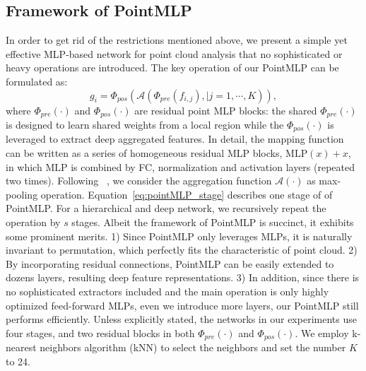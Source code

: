 \subsection{Framework of PointMLP}
In order to get rid of the restrictions mentioned above, we present a simple yet effective MLP-based network for point cloud analysis that no sophisticated or heavy operations are introduced. The key operation of our PointMLP can be formulated as:
\begin{equation}
    g_i = \Phi_{pos}\left(\mathcal{A}\left(\Phi_{pre}\left(f_{i,j}\right),|  j=1,\cdots, K\right)\right),
    \label{eq:pointMLP_stage}
\end{equation}
where $\Phi_{pre}\left(\cdot\right)$ and $\Phi_{pos}\left(\cdot\right)$ are residual point MLP blocks: the shared $\Phi_{pre}\left(\cdot\right)$ is designed to learn shared weights from a local region while the $\Phi_{pos}\left(\cdot\right)$ is leveraged to extract deep aggregated features. In detail, the mapping function can be written as a series of homogeneous residual MLP blocks, $ \mathrm{MLP}\left(x\right)+x$, in which $\mathrm{MLP}$ is combined by FC, normalization and activation layers (repeated two times). Following ~\citet{qi2017pointnet}, we consider the aggregation function $\mathcal{A}\left(\cdot\right)$ as max-pooling operation.  Equation~\ref{eq:pointMLP_stage} describes one stage of of PointMLP. For a hierarchical and deep network, we recursively repeat the operation by $s$ stages. Albeit the framework of PointMLP is succinct, it exhibits some prominent merits. 1) Since PointMLP only leverages MLPs, it is naturally invariant to permutation, which perfectly fits the characteristic of point cloud. 2) By incorporating residual connections, PointMLP can be easily extended to dozens layers, resulting deep feature representations. 3) In addition, since there is no sophisticated extractors included and the main operation is only highly optimized feed-forward MLPs, even we introduce more layers, our PointMLP still performs efficiently.  Unless explicitly stated, the networks in our experiments use four stages, and two residual blocks in both $\Phi_{pre}\left(\cdot\right)$ and $\Phi_{pos}\left(\cdot\right)$. We employ k-nearest neighbors algorithm (kNN) to select the neighbors and set the number $K$ to 24. 

